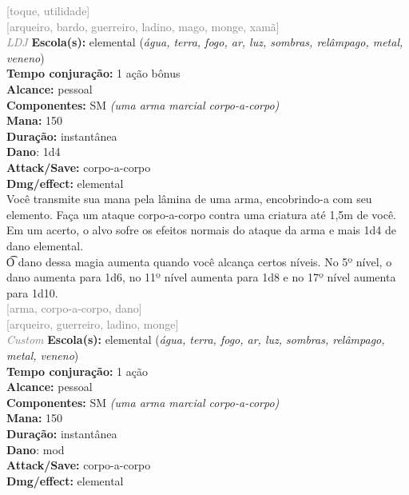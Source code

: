 \documentclass{RPG_Adventure}[2021/10/20]
\begin{document}
{\scriptsize \textcolor{gray}{[toque, utilidade]\\}}
{\scriptsize \textcolor{gray}{[arqueiro, bardo, guerreiro, ladino, mago, monge, xamã]\\}}
{\tiny \textcolor{gray}{\textit{LDJ}}}\jump{}
{\small \t \textbf{Escola(s):} elemental (\textit{água, terra, fogo, ar, luz, sombras, relâmpago, metal, veneno})\\\t \textbf{Tempo conjuração:} 1 ação bônus\\\t \textbf{Alcance:} pessoal\\\t \textbf{Componentes:} SM \textit{(uma arma marcial corpo-a-corpo)}\\\t \textbf{Mana:} 150\\\t \textbf{Duração:} instantânea\\\t \textbf{Dano}: 1d4\\\t \textbf{Attack/Save:} corpo-a-corpo\\\t \textbf{Dmg/effect:} elemental\\}
{\normalsize Você transmite sua mana pela lâmina de uma arma, encobrindo-a com seu elemento. Faça um ataque corpo-a-corpo contra uma criatura até 1,5m de você. Em um acerto, o alvo sofre os efeitos normais do ataque da arma e mais 1d4 de dano elemental.\\\t O dano dessa magia aumenta quando você alcança certos níveis. No 5º nível, o dano aumenta para 1d6, no 11º nível aumenta para 1d8 e no 17º nível aumenta para 1d10.\\}
{\scriptsize \textcolor{gray}{[arma, corpo-a-corpo, dano]\\}}
{\scriptsize \textcolor{gray}{[arqueiro, guerreiro, ladino, monge]\\}}
{\tiny \textcolor{gray}{\textit{Custom}}}\jump{}
{\small \t \textbf{Escola(s):} elemental (\textit{água, terra, fogo, ar, luz, sombras, relâmpago, metal, veneno})\\\t \textbf{Tempo conjuração:} 1 ação\\\t \textbf{Alcance:} pessoal\\\t \textbf{Componentes:} SM \textit{(uma arma marcial corpo-a-corpo)}\\\t \textbf{Mana:} 150\\\t \textbf{Duração:} instantânea\\\t \textbf{Dano}: mod\\\t \textbf{Attack/Save:} corpo-a-corpo\\\t \textbf{Dmg/effect:} elemental\\}
\end{document}
